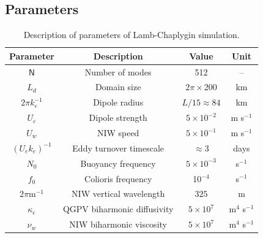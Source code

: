 \documentclass{jfm}
\begin{document}
\subsection{Parameters}

\begin{table}
 \begin{center}
   \caption{Description of parameters of Lamb-Chaplygin simulation.}
   \label{parameters_lamb}
   \begin{tabular}{ c | c | c | c}
     \hline
      Parameter & Description & Value & Unit \\
      \hline
      $\mathsf{N}$   & Number of modes &  512 & -- \\
      $L_d$ & Domain size & $2\pi\times 200$ & km \\
      $2\pi k_e^{-1}$ & Dipole radius & $L/15 \approx 84$ & km \\
      $U_e$ & Dipole strength & $5\times 10^{-2}$ & m s$^{-1}$ \\
      $U_w$ & NIW speed & $5\times 10^{-1}$ & m s$^{-1}$ \\
      $(U_e k_e)^{-1}$ & Eddy turnover timescale & $\approx 3$ & days\\
      $N_0$ & Buoyancy frequency & $5 \times 10^{-3}$ & s$^{-1}$\\
      $f_0$ & Colioris frequency & 10$^{-4}$ & s$^{-1}$\\
      $2\pi$m$^{-1}$ & NIW vertical wavelength &  $325$ & m \\
      $\kappa_e$ & QGPV biharmonic diffusivity & $5\times 10^{7}$  & m$^4$ s$^{-1}$\\
      $\nu_w$ & NIW biharmonic viscosity & $ 5 \times 10^{7}$ & m$^4$ s$^{-1}$\\
   \end{tabular}
 \end{center}
\end{table}
\end{document}

